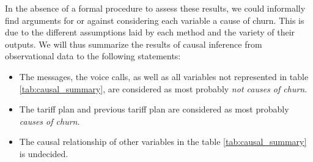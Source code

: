 In the absence of a formal procedure to assess these results, we could
informally find arguments for or against considering each variable a cause of
churn. This is due to the different assumptions laid by each method and the
variety of their outputs. We will thus summarize the results of causal inference
from observational data to the following statements:

\begin{itemize}
    \item The  messages, the voice calls, as well as all variables not
    represented in table \ref{tab:causal_summary}, are considered as most
    probably \emph{not causes of churn}.
    \item The tariff plan and previous tariff plan are considered as most
    probably \emph{causes of churn}.
    \item The causal relationship of other variables in the table
    \ref{tab:causal_summary} is undecided.
\end{itemize}
